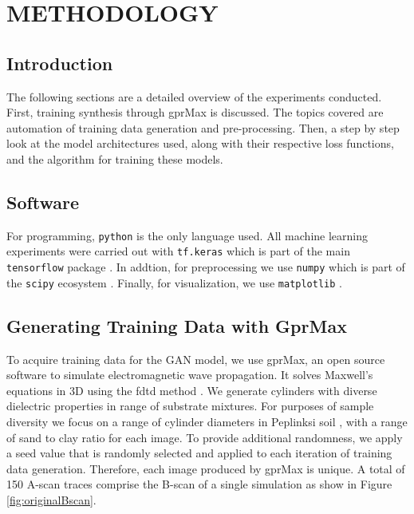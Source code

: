 \doublespacing
\chapter{METHODOLOGY}

\section{Introduction}
The following sections are a detailed overview of the experiments conducted. First, training synthesis through gprMax is discussed. The topics covered are automation of training data generation and pre-processing. Then, a step by step look at the model architectures used, along with their respective loss functions, and the algorithm for training these models.

\section{Software}
For programming, \lstinline{python} is the only language used. All machine learning experiments were carried out with \lstinline{tf.keras} which is part of the main \lstinline{tensorflow} package \cite{tensorflow}. In addtion, for preprocessing we use \lstinline{numpy} which is part of the \lstinline{scipy} ecosystem \cite{scipy}. Finally, for visualization, we use \lstinline{matplotlib} \cite{Hunter:2007}. 

\section{Generating Training Data with GprMax}
To acquire training data for the GAN model, we use gprMax, an open source software to simulate electromagnetic wave propagation. It solves Maxwell’s equations in 3D using the \acrfull{fdtd} method \cite{gprMax}. We generate cylinders with diverse dielectric properties in range of substrate mixtures. For purposes of sample diversity we focus on a range of cylinder diameters in Peplinksi soil \cite{peplinski}, with a range of sand to clay ratio for each image. To provide additional randomness, we apply a seed value that is randomly selected and applied to each iteration of training data generation. Therefore, each image produced by gprMax is unique. A total of 150 A-scan traces comprise the B-scan of a single simulation as show in Figure \ref{fig:originalBscan}. 

